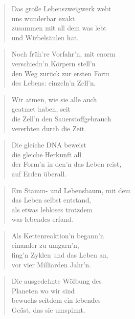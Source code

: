 \documentclass[10pt,a4paper]{article}
\begin{document}
\begin{multicols}{2}
\begin{verse}
Das große Lebenszweigwerk webt \\
uns wunderbar exakt \\
zusammen mit all dem was lebt \\
und Wirbelsäulen hat. \\
\end{verse}

\begin{verse}
Noch früh’re Vorfahr’n, mit enorm \\
verschiedn’n Körpern stell’n \\
den Weg zurück zur ersten Form \\
des Lebens: einzeln’n Zell’n. \\
\end{verse}

\begin{verse}
Wir atmen, wie sie alle auch \\
geatmet haben, seit \\
die Zell’n den Sauerstoffgebrauch \\
vererbten durch die Zeit. \\
\end{verse}

\begin{verse}
Die gleiche DNA beweist \\
die gleiche Herkunft all \\
der Form’n in den’n das Leben reist, \\
auf Erden überall. \\
\end{verse}

\begin{verse}
Ein Stamm- und Lebensbaum, mit dem \\
das Leben selbst entstand, \\
als etwas lebloses trotzdem \\
was lebendes erfand. \\
\end{verse}

\begin{verse}
Als Kettenreaktion’n begann’n \\
einander zu umgarn’n, \\
fing’n Zyklen und das Leben an, \\
vor vier Milliarden Jahr’n. \\
\end{verse}

\begin{verse}
Die ausgedehnte Wölbung des \\
Planeten wo wir sind \\
bewuchs seitdem ein lebendes \\
Geäst, das sie umspinnt. \\
\end{verse}


\end{multicols}
\end{document}
